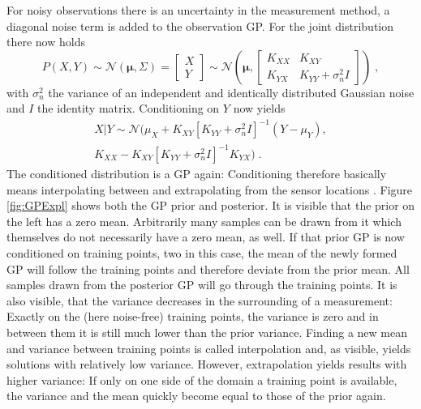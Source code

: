 \documentclass[%
  a4paper,oneside,%
  11pt,%
  smallchapters,
  style=printdev,
  extramargin,
  green,%
  rgb, <cmyk>
  ]{tubsbook}
\begin{document}
For noisy observations there is an uncertainty in the measurement method, a diagonal noise term is added to the observation GP. For the joint distribution there now holds
\begin{equation}
P(X,Y) \sim \mathcal{N}(\bm{\mu},\Sigma) = \begin{bmatrix}
           X \\
           Y
         \end{bmatrix} \sim \mathcal{N}\left( \bm{\mu}, \begin{bmatrix}
K_{XX} & K_{XY} \\
K_{YX} & K_{YY} + \sigma_n^2 I 
\end{bmatrix}  \right) \; ,
\label{eqn:noiseJoint}
\end{equation}
with $\sigma_n^2$ the variance of an independent and identically distributed Gaussian noise and $I$ the identity matrix. Conditioning on $Y$ now yields
\begin{equation}
\begin{aligned}
X|Y \sim \mathcal{N}(\mu_X +K_{XY} [K_{YY}+ \sigma_n^2 I ]^{-1}(Y-\mu_Y), \\
K_{XX} - K_{XY}[K_{YY}+ \sigma_n^2 I ]^{-1}K_{YX} ) \;.
\end{aligned}
\label{eqn:ConditioningDistr}
\end{equation}
The conditioned distribution is a GP again: Conditioning therefore basically means interpolating between and extrapolating from the sensor locations \cite{damianou2021}. 
%
%
Figure \ref{fig:GPExpl} shows both the GP prior and posterior. It is visible that the prior on the left has a zero mean. Arbitrarily many samples can be drawn from it which themselves do not necessarily have a zero mean, as well. If that prior GP is now conditioned on training points, two in this case, the mean of the newly formed GP will follow the training points and therefore deviate from the prior mean. All samples drawn from the posterior GP will go through the training points.  It is also visible, that the variance decreases in the surrounding of a measurement: Exactly on the (here noise-free) training points, the variance is zero and in between them it is still much lower than the prior variance. Finding a new mean and variance between training points is called interpolation and, as visible, yields solutions with relatively low variance. However, extrapolation yields results with higher variance: If only on one side of the domain a training point is available, the variance and the mean quickly become equal to those of the prior again.
\end{document}
